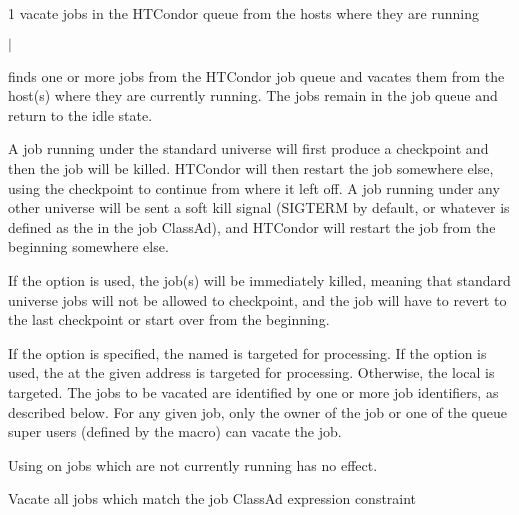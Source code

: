 \begin{ManPage}{\label{man-condor-vacate-job}}{1}
{vacate jobs in the HTCondor queue from the hosts where they are running}
\Synopsis {}
\ToolArgsBase

\ToolLocate
{}
\ToolJobs
$|$  \Dots

\ToolLocate
{}
\ToolAll


\Description

 finds one or more jobs from the HTCondor job queue
and vacates them from the host(s) where they are currently running.  
The jobs remain in the job queue and return to the idle state.

A job running under the standard universe will first produce a
checkpoint and then the job will be killed.
HTCondor will then restart the job somewhere else, using the checkpoint
to continue from where it left off.
A job running under any other universe will be sent a soft kill signal
(SIGTERM by default, or whatever is defined as the 
in the job ClassAd), and HTCondor will restart the job from the
beginning somewhere else. 

If the  option is used, the job(s) will be immediately killed,
meaning that standard universe jobs will not be allowed to checkpoint,
and the job will have to revert to the last checkpoint or start over
from the beginning.

If the  option is specified, the named  is
targeted for processing.  
If the  option is used, the  at the given
address is targeted for processing.  
Otherwise, the local  is targeted.
The jobs to be vacated are identified by one or more job identifiers, as
described below.
For any given job, only the owner of the job or one of the queue super users
(defined by the  macro) can vacate the job.

Using  on jobs which are not currently running has
no effect.

\begin{Options}
	\ToolArgsBaseDesc
	\ToolLocateDesc
	 {Vacate all jobs which match
	                the job ClassAd expression constraint}
\end{Options}


\end{ManPage}
